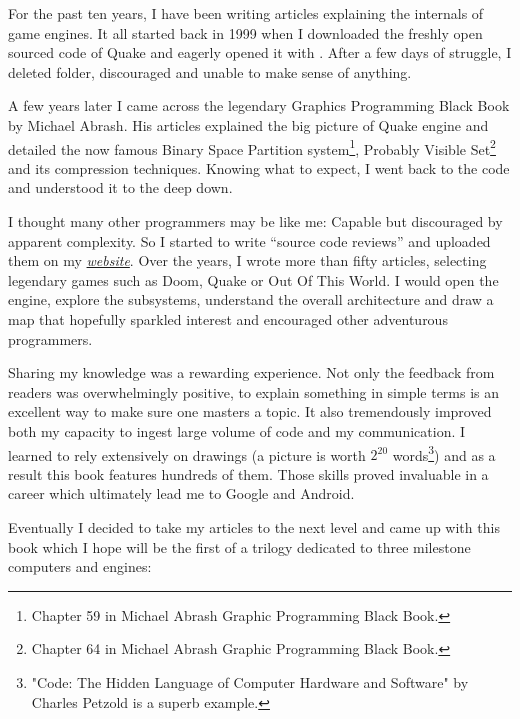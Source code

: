 \documentclass[book.tex]{subfiles}
\begin{document}
For the past ten years, I have been writing articles explaining the internals of game engines. It all started back in 1999 when I downloaded the freshly open sourced code of \mbox{Quake} and eagerly opened it with . After a few days of struggle, I deleted  folder, discouraged and unable to make sense of anything.

\bigskip

A few years later I came across the legendary Graphics Programming Black Book by Michael Abrash. His articles explained the big picture of Quake engine and detailed the now famous Binary Space Partition system\footnote{Chapter 59 in Michael Abrash Graphic Programming Black Book.}, Probably Visible Set\footnote{Chapter 64 in Michael Abrash Graphic Programming Black Book.} and its compression techniques. Knowing what to expect, I went back to the code and understood it to the deep down.

\bigskip

I thought many other programmers may be like me: Capable but discouraged by apparent complexity. So I started to write ``source  code reviews'' and uploaded them on my
\href{http://fabiensanglard.net}{\textit{website}}. Over the years, I wrote more than fifty articles, selecting legendary games such as Doom, Quake or Out Of This World. I would open the engine, explore the subsystems, understand the overall architecture and draw a map that hopefully sparkled interest and encouraged other adventurous programmers.

\bigskip

Sharing my knowledge was a rewarding experience. Not only the feedback from readers was overwhelmingly positive, to explain something in simple terms is an excellent way to make sure one masters a topic. It also tremendously improved both my capacity to ingest large volume of code and my communication. I learned to rely extensively on drawings (a picture is worth $2^{20}$ words\footnote{"Code: The Hidden Language of Computer Hardware and Software" by Charles Petzold is a superb example.}) and as a result this book features hundreds of them. Those skills proved invaluable in a career which ultimately lead me to Google and Android.

\newpage

Eventually I decided to take my articles to the next level and came up with this book which I hope will be the first of a trilogy dedicated to three milestone computers and engines:
\end{document}
